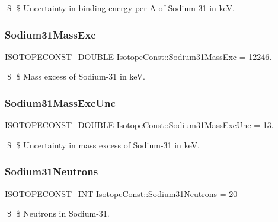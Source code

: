 \$ \$ Uncertainty in binding energy per A of Sodium-\/31 in keV. \mbox{\label{group___isotope_const-_sodium-_na31_gadbd4089ae9cac1f7e757d8f723cc6eec}} 
\subsubsection{\texorpdfstring{Sodium31\+Mass\+Exc}{Sodium31MassExc}}
{\footnotesize\ttfamily \mbox{\hyperlink{group___isotope_const-_macros_ga8f45a7272ce02c0b4c65c44636ed719a}{I\+S\+O\+T\+O\+P\+E\+C\+O\+N\+S\+T\+\_\+\+D\+O\+U\+B\+LE}} Isotope\+Const\+::\+Sodium31\+Mass\+Exc = 12246.}

\$ \$ Mass excess of Sodium-\/31 in keV. \mbox{\label{group___isotope_const-_sodium-_na31_ga6ecea77d2a99a16903a7762577293f32}} 
\subsubsection{\texorpdfstring{Sodium31\+Mass\+Exc\+Unc}{Sodium31MassExcUnc}}
{\footnotesize\ttfamily \mbox{\hyperlink{group___isotope_const-_macros_ga8f45a7272ce02c0b4c65c44636ed719a}{I\+S\+O\+T\+O\+P\+E\+C\+O\+N\+S\+T\+\_\+\+D\+O\+U\+B\+LE}} Isotope\+Const\+::\+Sodium31\+Mass\+Exc\+Unc = 13.}

\$ \$ Uncertainty in mass excess of Sodium-\/31 in keV. \mbox{\label{group___isotope_const-_sodium-_na31_gaca60d584869a77d3853cc10d1398445a}} 
\subsubsection{\texorpdfstring{Sodium31\+Neutrons}{Sodium31Neutrons}}
{\footnotesize\ttfamily \mbox{\hyperlink{group___isotope_const-_macros_ga5f18360b3e99483a35c32d789e62621c}{I\+S\+O\+T\+O\+P\+E\+C\+O\+N\+S\+T\+\_\+\+I\+NT}} Isotope\+Const\+::\+Sodium31\+Neutrons = 20}

\$ \$ Neutrons in Sodium-\/31. \mbox{\label{group___isotope_const-_sodium-_na31_ga1b1d1c5f18cd32015dd044a0d09aefb7}} 
